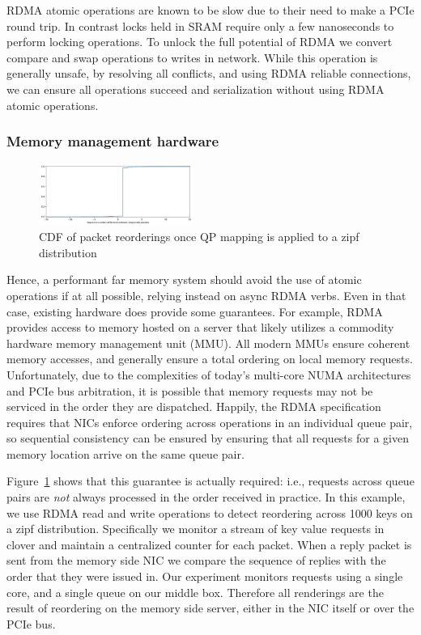 RDMA atomic operations are known to be slow due to their need to make a PCIe
round trip. In contrast locks held in SRAM require only a few nanoseconds to
perform locking operations. To unlock the full potential of RDMA we convert
compare and swap operations to writes in network. While this operation is
generally unsafe, by resolving all conflicts, and using RDMA reliable
connections, we can ensure all operations succeed and serialization without
using RDMA atomic operations.

\subsubsection{Memory management hardware}

\begin{figure}[t]
    \includegraphics[width=0.45\textwidth]{fig/qp_reordering.pdf}
    \caption{CDF of packet reorderings once QP mapping is applied to a zipf distribution}
    \label{fig:reorder}
\end{figure}

Hence, a performant far memory system should avoid the use of atomic operations
if at all possible, relying instead on async RDMA verbs.  Even in that case,
existing hardware does provide some guarantees.  For example, RDMA provides
access to memory hosted on a server that likely utilizes a commodity hardware
memory management unit (MMU).  All modern MMUs ensure coherent memory accesses,
and generally ensure a total ordering on local memory requests.  Unfortunately,
due to the complexities of today's multi-core NUMA architectures and PCIe bus
arbitration, it is possible that memory requests may not be serviced in the
order they are dispatched. Happily, the RDMA specification requires that NICs
enforce ordering across operations in an individual queue pair, so sequential
consistency can be ensured by ensuring that all requests for a given memory
location arrive on the same queue pair.

Figure~\ref{fig:reorder} shows that this guarantee is actually required: i.e.,
requests across queue pairs are \emph{not} always processed in the order
received in practice.  In this example, we use RDMA read and write operations to
detect reordering across 1000 keys on a zipf distribution. Specifically we
monitor a stream of key value requests in clover and maintain a centralized
counter for each packet. When a reply packet is sent from the memory side NIC we
compare the sequence of replies with the order that they were issued in. Our
experiment monitors requests using a single core, and a single queue on our
middle box. Therefore all renderings are the result of reordering on the memory
side server, either in the NIC itself or over the PCIe bus.


